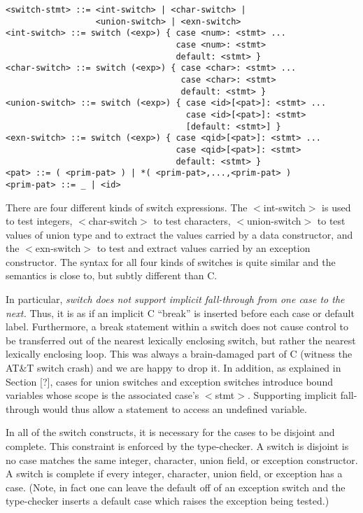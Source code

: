 \documentclass[titlepage,10pt]{article}
\begin{document}
\begin{verbatim}
<switch-stmt> ::= <int-switch> | <char-switch> | 
                  <union-switch> | <exn-switch>
<int-switch> ::= switch (<exp>) { case <num>: <stmt> ... 
                                  case <num>: <stmt>
                                  default: <stmt> }
<char-switch> ::= switch (<exp>) { case <char>: <stmt> ...
                                   case <char>: <stmt> 
                                   default: <stmt> }
<union-switch> ::= switch (<exp>) { case <id>[<pat>]: <stmt> ...
                                    case <id>[<pat>]: <stmt>
                                    [default: <stmt>] }
<exn-switch> ::= switch (<exp>) { case <qid>[<pat>]: <stmt> ...
                                  case <qid>[<pat>]: <stmt>
                                  default: <stmt> }
<pat> ::= ( <prim-pat> ) | *( <prim-pat>,...,<prim-pat> )
<prim-pat> ::= _ | <id> 
\end{verbatim}

There are four different kinds of switch expressions.  The
$<$int-switch$>$ is used to test integers, $<$char-switch$>$ to test
characters, $<$union-switch$>$ to test values of union type and to
extract the values carried by a data constructor, and the
$<$exn-switch$>$ to test and extract values carried by an exception
constructor.  The syntax for all four kinds of switches is quite similar
and the semantics is close to, but subtly different than C.

In particular, \textit{switch does not support implicit fall-through
from one case to the next.}  Thus, it is as if an implicit C ``break''
is inserted before each case or default label.  Furthermore, a break
statement within a switch does not cause control to be transferred out
of the nearest lexically enclosing switch, but rather the nearest
lexically enclosing loop.  This was always a brain-damaged part of C
(witness the AT\&T switch crash) and we are happy to drop it.  In
addition, as explained in Section [?], cases for union switches and
exception switches introduce bound variables whose scope is the
associated case's $<$stmt$>$.   Supporting implicit fall-through would
thus allow a statement to access an undefined variable.

In all of the switch constructs, it is necessary for the cases to be
disjoint and complete.  This constraint is enforced by the type-checker.
A switch is disjoint is no case matches the same integer, character,
union field, or exception constructor.  A switch is complete if every
integer, character, union field, or exception has a case.  (Note, in
fact one can leave the default off of an exception switch and the
type-checker inserts a default case which raises the exception being
tested.)
\end{document}
